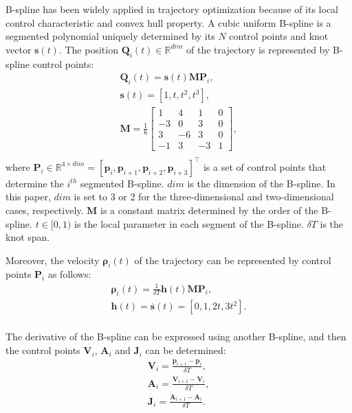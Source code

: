 \documentclass[preprint,5p,times,twocolumn,authoryear]{elsarticle}
\begin{document}
B-spline has been widely applied in trajectory optimization \citep{xu2022vision, usenko2017real, zhou2020ego} because of its local control characteristic and convex hull property. A cubic uniform B-spline is a segmented polynomial uniquely determined by its $N$ control points and knot vector $\textbf{s}(t)$. The position $\textbf{Q}_i(t) \in \mathbb{R}^{dim}$ of the trajectory is represented by B-spline control points:
\begin{equation}
\label{eq.bspline1}
\begin{aligned}
    & \textbf{Q}_i(t)=\textbf{s}(t)\textbf{M}\textbf{P}_i, &\\
    & \textbf{s}(t) = [1,t,t^2,t^3], &\\
    & \textbf{M} = \frac{1}{6}\left[\begin{array}{cccc}
        1 & 4 & 1 & 0 \\
        -3 & 0 & 3 & 0 \\
        3 & -6 & 3 & 0 \\
        -1 & 3 & -3 & 1
        \end{array}\right],&\\
\end{aligned}
\end{equation}
where $\textbf{P}_i \in \mathbb{R}^{4 \times dim} = [\textbf{p}_{i},\textbf{p}_{i+1},\textbf{p}_{i+2},\textbf{p}_{i+3}]^\top$ is a set of control points that determine the $i^{th}$ segmented B-spline. $dim$ is the dimension of the B-spline. In this paper, $dim$ is set to 3 or 2 for the three-dimensional and two-dimensional cases, respectively. $\textbf{M}$ is a constant matrix \citep{piegl1996nurbs} determined by the order of the B-spline. $t \in [0,1)$ is the local parameter in each segment of the B-spline. $\delta T$ is the knot span.

Moreover, the velocity $\bm{\rho}_i(t)$ of the trajectory can be represented by control points $\textbf{P}_i$ as follows:
\begin{equation}
\label{eq.bspline2}
\begin{aligned}
    & \bm{\rho}_i(t)=\frac{1}{\delta T} \textbf{h}(t) \textbf{M} \textbf{P}_i, &\\
    & \textbf{h}(t) = \overset{.}{\textbf{s}}(t) = [0,1,2t,3t^2]. &\\
\end{aligned}
\end{equation}

The derivative of the B-spline can be expressed using another B-spline, and then the control points $\textbf{V}_i$, $\textbf{A}_i$ and $\textbf{J}_i$ can be determined:
\begin{equation}
\label{eq.bspline3}
\begin{aligned}
    & \textbf{V}_i = \frac{\textbf{p}_{i+1}-\textbf{p}_{i}}{\delta T}, &\\
    & \textbf{A}_i = \frac{\textbf{V}_{i+1}-\textbf{V}_{i}}{\delta T}, &\\
    & \textbf{J}_i = \frac{\textbf{A}_{i+1}-\textbf{A}_{i}}{\delta T}. &\\
\end{aligned}
\end{equation}
\end{document}
